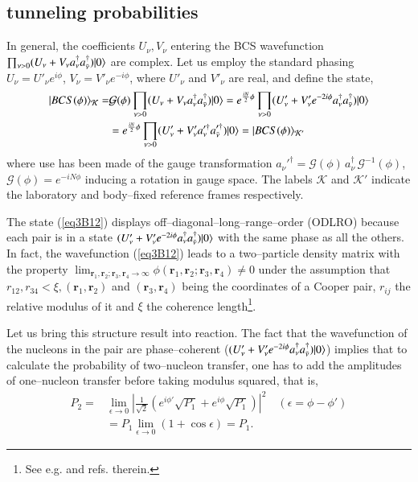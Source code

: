 \begin{subappendices}
 \subsection{tunneling probabilities}
 In general, the coefficients $U_\nu,V_\nu$ entering the BCS wavefunction $\prod_{\nu>0}(U_\nu+V_\nu a_\nu^\dagger a_{\bar{\nu}}^\dagger)|{0} \rangle$ are complex. Let us employ the standard phasing $U_\nu=U'_\nu e^{i\phi}$, $V_\nu=V'_\nu e^{-i\phi}$, where $U'_\nu$ and $V'_\nu$ are real, and define the state,
 \begin{align}\label{eq3B12}
\nonumber |{BCS(\phi)} \rangle_{\mathcal K}=&\mathcal G(\phi) \prod_{\nu>0}(U_\nu+V_\nu a_\nu^\dagger a_{\bar{\nu}}^\dagger)|{0} \rangle=e^{\frac{iN}{2}\phi}\prod_{\nu>0}(U'_\nu+V'_\nu e^{-2i\phi} a_\nu^\dagger a_{\bar{\nu}}^\dagger)|{0} \rangle\\
&=e^{\frac{iN}{2}\phi}\prod_{\nu>0}(U'_\nu+V'_\nu  a_\nu'^\dagger a_{\bar{\nu}}'^\dagger)|{0} \rangle=|{BCS(\phi)} \rangle_{\mathcal K'}
 \end{align}  
 where use has been made of the gauge transformation $a_\nu'^\dagger=\mathcal G(\phi)\,a_\nu^\dagger\,\mathcal G^{-1}(\phi)$, $\mathcal G(\phi)=e^{-iN\phi}$ inducing a rotation in gauge space. The labels $\mathcal K$ and $\mathcal K'$ indicate the laboratory and body--fixed reference frames respectively.
 
 
 The state (\ref{eq3B12}) displays off--diagonal--long--range--order (ODLRO) because each pair is in a state $(U'_\nu+V'_\nu e^{-2i\phi} a_\nu^\dagger a_{\bar{\nu}}^\dagger)|{0} \rangle$ with the same phase as all the others. In fact, the wavefunction (\ref{eq3B12}) leads to a two--particle density matrix with the property $\lim_{\mathbf r_1, \mathbf r_2;\mathbf r_3, \mathbf r_4\rightarrow\infty}\phi(\mathbf r_1, \mathbf r_2;\mathbf r_3, \mathbf r_4)\neq 0$ under the assumption that $r_{12}, r_{34}<\xi, (\mathbf r_1, \mathbf r_2)$ and $(\mathbf r_3, \mathbf r_4)$ being the coordinates of a Cooper pair, $r_{ij}$ the relative modulus of it and $\xi$ the coherence length\footnote{See e.g. \cite{Ambegaokar:69} and refs. therein.}.
 
 
 Let us bring this structure result into reaction. The fact that the wavefunction of the nucleons in the pair are phase--coherent ($(U'_\nu+V'_\nu e^{-2i\phi} a_\nu^\dagger a_{\bar{\nu}}^\dagger)|{0} \rangle$) implies that to calculate the probability of two--nucleon transfer, one has to add the amplitudes of one--nucleon transfer before taking modulus squared, that is,
 \begin{align}\label{eq3B13}
\nonumber P_2=&\lim_{\epsilon\rightarrow 0}\left|\frac{1}{\sqrt{2}}\left(e^{i\phi'}\sqrt{P_1}+e^{i\phi}\sqrt{P_1}\right)\right|^2\quad(\epsilon=\phi-\phi')\\
&=P_1\lim_{\epsilon\rightarrow0}(1+\cos \epsilon)=P_1.
 \end{align}  



\end{subappendices}
